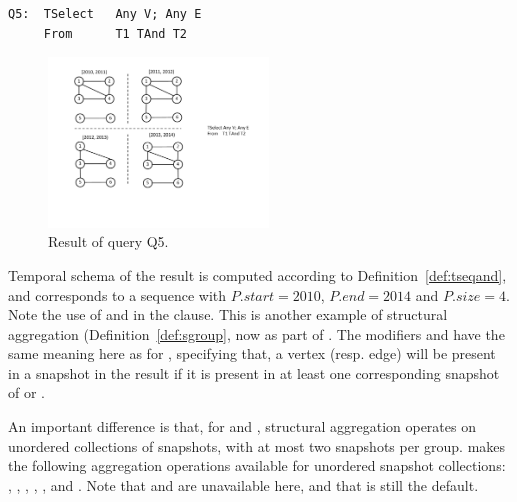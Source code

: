 \begin{small}
\begin{verbatim}
Q5:  TSelect   Any V; Any E
     From      T1 TAnd T2
\end{verbatim}
\end{small}

\begin{figure}
\centering
\includegraphics[width=2.3in]{figs/q5.pdf}
\caption{Result of query Q5.}
\label{fig:q5}
\end{figure}

Temporal schema of the result is computed according to
Definition~\ref{def:tseqand}, and corresponds to a sequence with
$P.start = 2010$, $P.end=2014$ and $P.size=4$.  Note the use of
 and  in the  clause.  This
is another example of structural aggregation
(Definition~\ref{def:sgroup}, now as part of .  The
modifiers  and  have the same meaning here as
for , specifying that, a vertex (resp. edge) will be
present in a snapshot in the result if it is present in at least one
corresponding snapshot of  or .  

An important difference is that, for  and ,
structural aggregation operates on unordered collections of snapshots,
with at most two snapshots per group.  \ql makes the following
aggregation operations available for unordered snapshot collections:
, , , , , and
.  Note that  and  are
unavailable here, and that  is still the default.




